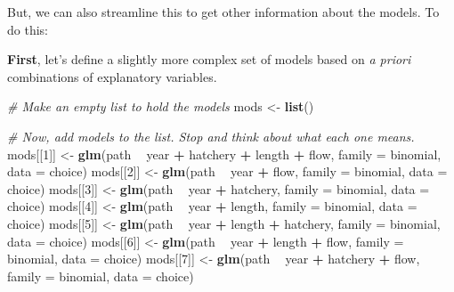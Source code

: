 \documentclass[
]{book}
\newenvironment{Shaded}{\begin{snugshade}}{\end{snugshade}}
\newcommand{\CommentTok}[1]{\textcolor[rgb]{0.56,0.35,0.01}{\textit{#1}}}
\newcommand{\DataTypeTok}[1]{\textcolor[rgb]{0.13,0.29,0.53}{#1}}
\newcommand{\DecValTok}[1]{\textcolor[rgb]{0.00,0.00,0.81}{#1}}
\newcommand{\KeywordTok}[1]{\textcolor[rgb]{0.13,0.29,0.53}{\textbf{#1}}}
\newcommand{\NormalTok}[1]{#1}
\newcommand{\OperatorTok}[1]{\textcolor[rgb]{0.81,0.36,0.00}{\textbf{#1}}}
\newcommand{\StringTok}[1]{\textcolor[rgb]{0.31,0.60,0.02}{#1}}
\begin{document}
But, we can also streamline this to get other information about the models. To do this:

\textbf{First}, let's define a slightly more complex set of models based on \emph{a priori} combinations of explanatory variables.

\begin{Shaded}
\begin{Highlighting}[]
\CommentTok{# Make an empty list to hold the models}
\NormalTok{mods <-}\StringTok{ }\KeywordTok{list}\NormalTok{()}

\CommentTok{# Now, add models to the list. Stop and think about what each one means.}
\NormalTok{mods[[}\DecValTok{1}\NormalTok{]] <-}\StringTok{ }\KeywordTok{glm}\NormalTok{(path }\OperatorTok{~}\StringTok{ }\NormalTok{year }\OperatorTok{+}\StringTok{ }\NormalTok{hatchery }\OperatorTok{+}\StringTok{ }\NormalTok{length }\OperatorTok{+}\StringTok{ }\NormalTok{flow, }\DataTypeTok{family =}\NormalTok{ binomial, }\DataTypeTok{data =}\NormalTok{ choice)}
\NormalTok{mods[[}\DecValTok{2}\NormalTok{]] <-}\StringTok{ }\KeywordTok{glm}\NormalTok{(path }\OperatorTok{~}\StringTok{ }\NormalTok{year }\OperatorTok{+}\StringTok{ }\NormalTok{flow, }\DataTypeTok{family =}\NormalTok{ binomial, }\DataTypeTok{data =}\NormalTok{ choice)}
\NormalTok{mods[[}\DecValTok{3}\NormalTok{]] <-}\StringTok{ }\KeywordTok{glm}\NormalTok{(path }\OperatorTok{~}\StringTok{ }\NormalTok{year }\OperatorTok{+}\StringTok{ }\NormalTok{hatchery, }\DataTypeTok{family =}\NormalTok{ binomial, }\DataTypeTok{data =}\NormalTok{ choice)}
\NormalTok{mods[[}\DecValTok{4}\NormalTok{]] <-}\StringTok{ }\KeywordTok{glm}\NormalTok{(path }\OperatorTok{~}\StringTok{ }\NormalTok{year }\OperatorTok{+}\StringTok{ }\NormalTok{length, }\DataTypeTok{family =}\NormalTok{ binomial, }\DataTypeTok{data =}\NormalTok{ choice)}
\NormalTok{mods[[}\DecValTok{5}\NormalTok{]] <-}\StringTok{ }\KeywordTok{glm}\NormalTok{(path }\OperatorTok{~}\StringTok{ }\NormalTok{year }\OperatorTok{+}\StringTok{ }\NormalTok{length }\OperatorTok{+}\StringTok{ }\NormalTok{hatchery, }\DataTypeTok{family =}\NormalTok{ binomial, }\DataTypeTok{data =}\NormalTok{ choice)}
\NormalTok{mods[[}\DecValTok{6}\NormalTok{]] <-}\StringTok{ }\KeywordTok{glm}\NormalTok{(path }\OperatorTok{~}\StringTok{ }\NormalTok{year }\OperatorTok{+}\StringTok{ }\NormalTok{length }\OperatorTok{+}\StringTok{ }\NormalTok{flow, }\DataTypeTok{family =}\NormalTok{ binomial, }\DataTypeTok{data =}\NormalTok{ choice)}
\NormalTok{mods[[}\DecValTok{7}\NormalTok{]] <-}\StringTok{ }\KeywordTok{glm}\NormalTok{(path }\OperatorTok{~}\StringTok{ }\NormalTok{year }\OperatorTok{+}\StringTok{ }\NormalTok{hatchery }\OperatorTok{+}\StringTok{ }\NormalTok{flow, }\DataTypeTok{family =}\NormalTok{ binomial, }\DataTypeTok{data =}\NormalTok{ choice)}
\end{Highlighting}
\end{Shaded}
\end{document}
